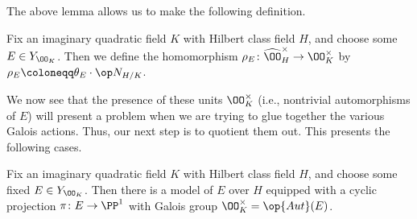 \documentclass[../notes.tex]{subfiles}
\begin{document}
The above lemma allows us to make the following definition.
\begin{notation}
	Fix an imaginary quadratic field $K$ with Hilbert class field $H$, and choose some $E\in Y_{\OO_K}$. Then we define the homomorphism $\rho_E\colon\widehat\OO_H^\times\to\OO_K^\times$ by $\rho_E\coloneqq\theta_E\cdot\op N_{H/K}$.
\end{notation}
We now see that the presence of these units $\OO_K^\times$ (i.e., nontrivial automorphisms of $E$) will present a problem when we are trying to glue together the various Galois actions. Thus, our next step is to quotient them out. This presents the following cases.
\begin{lemma}
	Fix an imaginary quadratic field $K$ with Hilbert class field $H$, and choose some fixed $E\in Y_{\OO_K}$. Then there is a model of $E$ over $H$ equipped with a cyclic projection $\pi\colon E\to\PP^1$ with Galois group $\OO_K^\times=\op{Aut}(E)$.
\end{lemma}
\end{document}
